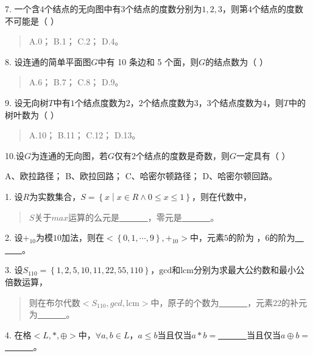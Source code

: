 \documentclass[fontset=exam]{exam-zh}
\providecommand{\ul}[1]{\uline{#1}}
\begin{document}
7. 一个含\(4\)个结点的无向图中有\(3\)个结点的度数分别为\(1,2,3\)，则第\(4\)个结点的度数不可能是（ ）

\begin{quote}
A.0； B.1； C.2； D.4。
\end{quote}

8. 设连通的简单平面图\(G\)中有 10 条边和 5 个面，则\(G\)的结点数为（ ）

\begin{quote}
A.6； B.7； C.8； D.9。
\end{quote}

9. 设无向树\(T\)中有\(1\)个结点度数为\(2\)，\(2\)个结点度数为\(3\)，\(3\)个结点度数为\(4\)，则\(T\)中的树叶数为（ ）

\begin{quote}
A.10； B.11； C.12； D.13。
\end{quote}

10.设\(G\)为连通的无向图，若\(G\)仅有\(2\)个结点的度数是奇数，则\(G\)一定具有（ ）

A、欧拉路径； B、欧拉回路； C、哈密尔顿路径； D、哈密尔顿回路。


\par{}\smallskip

1. 设\(R\)为实数集合，\(S = \left\{ x \middle| x \in R \land 0 \leq x \leq 1 \right\}\)，则在代数\(< S,max >\)中，

\begin{quote}
\(S\)关于\(max\)运算的么元是\ul{＿ ＿＿}，零元是\ul{＿ ＿＿}。
\end{quote}

2. 设\(+_{10}\)为模\(10\)加法，则在\(< \left\{ 0,1,\cdots,9 \right\}, +_{10} >\)中，元素\(5\)的阶为 ，\(6\)的阶为\ul{＿ ＿＿}。

3. 设\(S_{110} = \left\{ 1,2,5,10,11,22,55,110 \right\}\)，\(\text{g}\text{c}\text{d}\)和\(\text{l}\text{c}\text{m}\)分别为求最大公约数和最小公倍数运算，

\begin{quote}
则在布尔代数\(< S_{110},gcd,\text{l}\text{c}\text{m} >\)中，原子的个数为\ul{＿ ＿＿}，元素\(22\)的补元为\ul{＿ ＿＿}。
\end{quote}

4. 在格\(< L, \ast , \oplus >\)中，\(\forall a,b \in L\)，\(a \leq b\)当且仅当\(a \ast b =\)\ul{＿ ＿＿}当且仅当\(a \oplus b =\)\ul{＿ ＿＿}。
\end{document}
